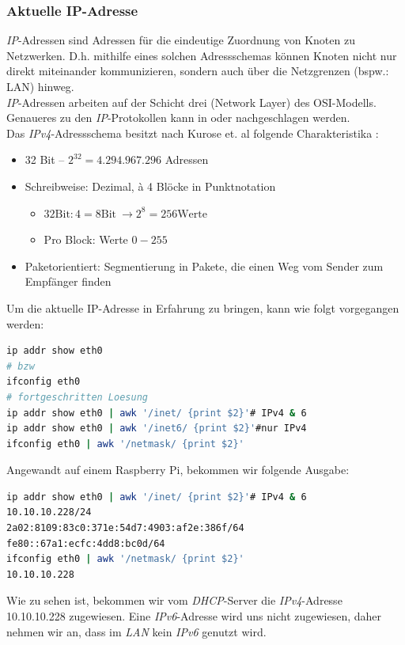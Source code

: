 \documentclass[paper=a4,fontsize=11pt]{scrartcl}%
\numberwithin{equation}{section}
\begin{document}
\subsubsection{Aktuelle IP-Adresse} \label{curr_ip}
\emph{IP}-Adressen sind Adressen für die eindeutige Zuordnung von Knoten zu Netzwerken. D.h. mithilfe eines solchen Adressschemas können Knoten nicht nur direkt miteinander kommunizieren, sondern auch über die Netzgrenzen (bspw.: \ac{LAN}) hinweg.\\
\emph{IP}-Adressen arbeiten auf der Schicht drei (Network Layer) des \ac{OSI}-Modells. Genaueres zu den \emph{IP}-Protokollen kann in \cite[S. 439ff]{Tanenbaum:2002:CN:572404} oder \cite[S. 331ff]{Kurose:2012:CNT:2584507} nachgeschlagen werden.\\
Das \emph{IPv4}-Adressschema besitzt nach Kurose et. al folgende Charakteristika \cite[S. 338ff]{Kurose:2012:CNT:2584507}:
\begin{itemize}
	\item 32 Bit -- $2^{32} = 4.294.967.296$ Adressen
	\item Schreibweise: Dezimal, à 4 Blöcke in Punktnotation
	\begin{itemize}
		\item $32 \text{Bit} : 4 = 8\text{Bit}~ \rightarrow 2^8 = 256\text{Werte}$ 
		\item Pro Block: Werte $0-255$
	\end{itemize}
	\item Paketorientiert: Segmentierung in Pakete, die einen Weg vom Sender zum Empfänger finden
\end{itemize}

Um die aktuelle IP-Adresse in Erfahrung zu bringen, kann wie folgt vorgegangen werden:
\begin{lstlisting}[style=Bash, language=Bash]
ip addr show eth0 
# bzw
ifconfig eth0
# fortgeschritten Loesung
ip addr show eth0 | awk '/inet/ {print $2}'# IPv4 & 6
ip addr show eth0 | awk '/inet6/ {print $2}'#nur IPv4
ifconfig eth0 | awk '/netmask/ {print $2}'
\end{lstlisting}
Angewandt auf einem Raspberry Pi, bekommen wir folgende Ausgabe:
\begin{lstlisting}[style=Bash, language=Bash]
ip addr show eth0 | awk '/inet/ {print $2}'# IPv4 & 6
10.10.10.228/24
2a02:8109:83c0:371e:54d7:4903:af2e:386f/64
fe80::67a1:ecfc:4dd8:bc0d/64
ifconfig eth0 | awk '/netmask/ {print $2}'
10.10.10.228
\end{lstlisting}
Wie zu sehen ist, bekommen wir vom \emph{DHCP}-Server die \emph{IPv4}-Adresse 10.10.10.228 zugewiesen. Eine \emph{IPv6}-Adresse wird uns nicht zugewiesen, daher nehmen wir an, dass im \emph{LAN} kein \emph{IPv6} genutzt wird.
\end{document}
